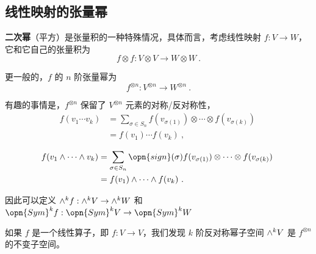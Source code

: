 \subsection{线性映射的张量幂}


\textbf{二次幂}（平方）是张量积的一种特殊情况，具体而言，考虑线性映射 $f: V \to W$，它和它自己的张量积为
\begin{equation}
f \otimes f: V \otimes V \to W \otimes W~.
\end{equation}

更一般的，$f$ 的 $n$ 阶张量幂为
\begin{equation}
f^{\otimes n}: V^{\otimes n} \to W^{\otimes n}~.
\end{equation}

有趣的事情是，$f^{\otimes n}$ 保留了 $V^{\otimes n}$ 元素的对称/反对称性，
\begin{equation}
\begin{aligned}
f(v_1 \cdots v_k) &= \sum_{\sigma \in S_n} f(v_{\sigma(1)}) \otimes \cdots \otimes f(v_{\sigma(k)}) \\
&= f(v_1) \cdots f(v_k)~,
\end{aligned}~
\end{equation}

\begin{equation}
\begin{aligned}
f(v_1 \wedge \cdots \wedge v_k) &= \sum_{\sigma \in S_n} \opn{sign}(\sigma) f(v_{\sigma(1)}) \otimes \cdots \otimes f(v_{\sigma(k)}) \\
&= f(v_1) \wedge \cdots \wedge f(v_k)~.
\end{aligned}~
\end{equation}

因此可以定义 ${\large \wedge}^k f: {\large \wedge}^k V \to {\large \wedge}^k W$ 和 $\opn{Sym}^k f: \opn{Sym}^k V \to \opn{Sym}^k W$

如果 $f$ 是一个线性算子，即 $f: V \to V$，我们发现 $k$ 阶反对称幂子空间 ${\large \wedge}^k V$ 是 $f^{\otimes n}$ 的不变子空间。